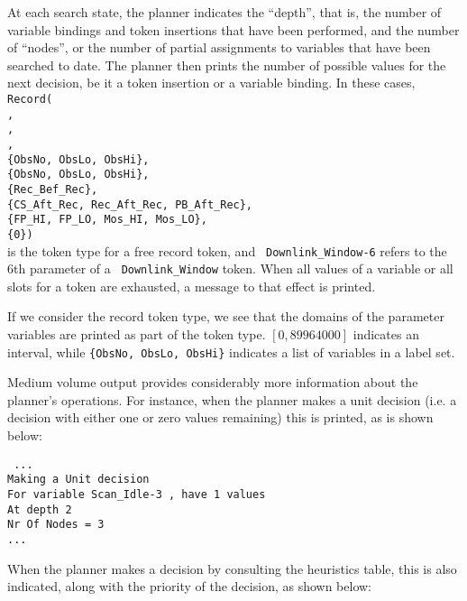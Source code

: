 At each search state, the planner indicates the ``depth'', that is,
the number of variable bindings and token insertions that have been
performed, and the number of ``nodes'', or the number of partial
assignments to variables that have been searched to date.  The planner
then prints the number of possible values for the next decision, be it
a token insertion or a variable binding.  In these cases, \\
{\tt Record( \\
\indent [0,89964000], \\
\indent [0,90000000], \\
\indent [0,+INF], \\
\indent \{ObsNo, ObsLo, ObsHi\}, \\
\indent \{ObsNo, ObsLo, ObsHi\}, \\
\indent \{Rec\_Bef\_Rec\}, \\
\indent \{CS\_Aft\_Rec, Rec\_Aft\_Rec, PB\_Aft\_Rec\}, \\
\indent \{FP\_HI, FP\_LO, Mos\_HI, Mos\_LO\}, \\
\indent \{0\})}\\
\noindent is the token type for a free record token, and {\tt
Downlink\_Window-6} refers to the 6th parameter of a {\tt
Downlink\_Window} token.  When all values of a variable or all slots for
a token are exhausted, a message to that effect is printed.

If we consider the record token type, we see that the domains of the parameter
variables are printed as part of the token type.  {\tt $[0,89964000]$} indicates
an interval, while {\tt \{ObsNo, ObsLo, ObsHi\}} indicates a list of variables
in a label set.  


Medium volume output provides considerably more information about the
planner's operations.  For instance, when the planner makes a unit decision
(i.e. a decision with either one or zero values remaining) this is printed,
as is shown below:

{\tt
\noindent ...\\
Making a Unit decision\\
For variable Scan\_Idle-3 , have 1 values\\
At depth 2\\
Nr Of Nodes = 3\\
...}

When the planner makes a decision by consulting the heuristics table, this
is also indicated, along with the priority of the decision, as shown
below:

